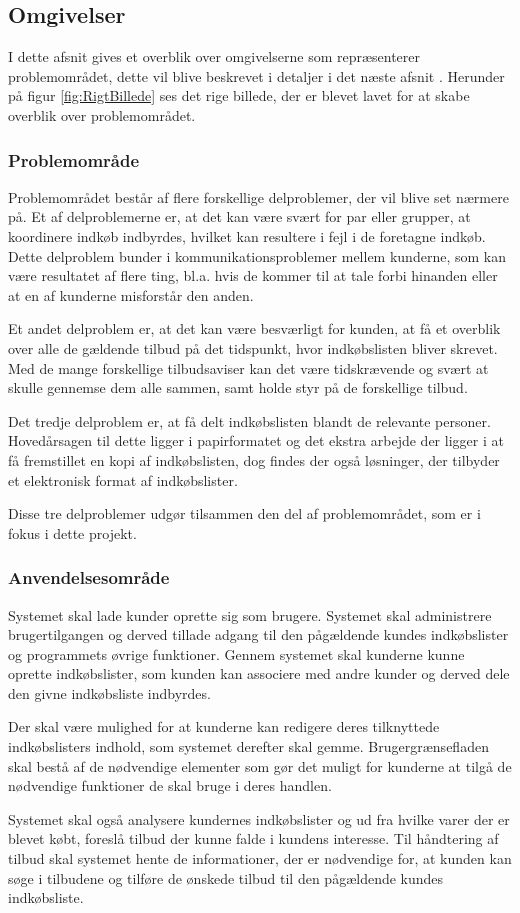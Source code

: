 \subsection{Omgivelser}
I dette afsnit gives et overblik over omgivelserne som repræsenterer problemområdet, dette vil blive beskrevet i detaljer i det næste afsnit . Herunder på figur \ref{fig:RigtBillede} ses det rige billede, der er blevet lavet for at skabe overblik over problemområdet. 

\subsubsection{Problemområde}
Problemområdet består af flere forskellige delproblemer, der vil blive set nærmere på. Et af delproblemerne er, at det kan være svært for par eller grupper, at koordinere indkøb indbyrdes, hvilket kan resultere i fejl i de foretagne indkøb. Dette delproblem bunder i kommunikationsproblemer mellem kunderne, som kan være resultatet af flere ting, bl.a. hvis de kommer til at tale forbi hinanden eller at en af kunderne misforstår den anden.


Et andet delproblem er, at det kan være besværligt for kunden, at få et overblik over alle de gældende tilbud på det tidspunkt, hvor indkøbslisten bliver skrevet. Med de mange forskellige tilbudsaviser kan det være tidskrævende og svært at skulle gennemse dem alle sammen, samt holde styr på de forskellige tilbud.

Det tredje delproblem er, at få delt indkøbslisten blandt de relevante personer. Hovedårsagen til dette ligger i papirformatet og det ekstra arbejde der ligger i at få fremstillet en kopi af indkøbslisten, dog findes der også løsninger, der tilbyder et elektronisk format af indkøbslister.

Disse tre delproblemer udgør tilsammen den del af problemområdet, som er i fokus i dette projekt.


\subsubsection{Anvendelsesområde}
Systemet skal lade kunder oprette sig som brugere. Systemet skal administrere brugertilgangen og derved tillade adgang til den pågældende kundes indkøbslister og programmets øvrige funktioner.
Gennem systemet skal kunderne kunne oprette indkøbslister, som kunden kan associere med andre kunder og derved dele den givne indkøbsliste indbyrdes.

Der skal være mulighed for at kunderne kan redigere deres tilknyttede indkøbslisters indhold, som systemet derefter skal gemme. Brugergrænsefladen skal bestå af de nødvendige elementer som gør det muligt for kunderne at tilgå de nødvendige funktioner de skal bruge i deres handlen.

Systemet skal også analysere kundernes indkøbslister og ud fra hvilke varer der er blevet købt, foreslå tilbud der kunne falde i kundens interesse. Til håndtering af tilbud skal systemet hente de informationer, der er nødvendige for, at kunden kan søge i tilbudene og tilføre de ønskede tilbud til den pågældende kundes indkøbsliste.